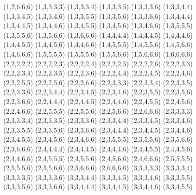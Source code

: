 \begin{tabbing}
(1,2,6,6,6) \> (1,3,3,3,3) \> (1,3,3,3,4) \> (1,3,3,3,5) \> (1,3,3,3,6) \> (1,3,3,4,4) \\ 
(1,3,3,4,5) \> (1,3,3,4,6) \> (1,3,3,5,5) \> (1,3,3,5,6) \> (1,3,3,6,6) \> (1,3,4,4,4) \\ 
(1,3,4,4,5) \> (1,3,4,4,6) \> (1,3,4,5,5) \> (1,3,4,5,6) \> (1,3,4,6,6) \> (1,3,5,5,5) \\ 
(1,3,5,5,6) \> (1,3,5,6,6) \> (1,3,6,6,6) \> (1,4,4,4,4) \> (1,4,4,4,5) \> (1,4,4,4,6) \\ 
(1,4,4,5,5) \> (1,4,4,5,6) \> (1,4,4,6,6) \> (1,4,5,5,5) \> (1,4,5,5,6) \> (1,4,5,6,6) \\ 
(1,4,6,6,6) \> (1,5,5,5,5) \> (1,5,5,5,6) \> (1,5,5,6,6) \> (1,5,6,6,6) \> (1,6,6,6,6) \\ 
(2,2,2,2,2) \> (2,2,2,2,3) \> (2,2,2,2,4) \> (2,2,2,2,5) \> (2,2,2,2,6) \> (2,2,2,3,3) \\ 
(2,2,2,3,4) \> (2,2,2,3,5) \> (2,2,2,3,6) \> (2,2,2,4,4) \> (2,2,2,4,5) \> (2,2,2,4,6) \\ 
(2,2,2,5,5) \> (2,2,2,5,6) \> (2,2,2,6,6) \> (2,2,3,3,3) \> (2,2,3,3,4) \> (2,2,3,3,5) \\ 
(2,2,3,3,6) \> (2,2,3,4,4) \> (2,2,3,4,5) \> (2,2,3,4,6) \> (2,2,3,5,5) \> (2,2,3,5,6) \\ 
(2,2,3,6,6) \> (2,2,4,4,4) \> (2,2,4,4,5) \> (2,2,4,4,6) \> (2,2,4,5,5) \> (2,2,4,5,6) \\ 
(2,2,4,6,6) \> (2,2,5,5,5) \> (2,2,5,5,6) \> (2,2,5,6,6) \> (2,2,6,6,6) \> (2,3,3,3,3) \\ 
(2,3,3,3,4) \> (2,3,3,3,5) \> (2,3,3,3,6) \> (2,3,3,4,4) \> (2,3,3,4,5) \> (2,3,3,4,6) \\ 
(2,3,3,5,5) \> (2,3,3,5,6) \> (2,3,3,6,6) \> (2,3,4,4,4) \> (2,3,4,4,5) \> (2,3,4,4,6) \\ 
(2,3,4,5,5) \> (2,3,4,5,6) \> (2,3,4,6,6) \> (2,3,5,5,5) \> (2,3,5,5,6) \> (2,3,5,6,6) \\ 
(2,3,6,6,6) \> (2,4,4,4,4) \> (2,4,4,4,5) \> (2,4,4,4,6) \> (2,4,4,5,5) \> (2,4,4,5,6) \\ 
(2,4,4,6,6) \> (2,4,5,5,5) \> (2,4,5,5,6) \> (2,4,5,6,6) \> (2,4,6,6,6) \> (2,5,5,5,5) \\ 
(2,5,5,5,6) \> (2,5,5,6,6) \> (2,5,6,6,6) \> (2,6,6,6,6) \> (3,3,3,3,3) \> (3,3,3,3,4) \\ 
(3,3,3,3,5) \> (3,3,3,3,6) \> (3,3,3,4,4) \> (3,3,3,4,5) \> (3,3,3,4,6) \> (3,3,3,5,5) \\ 
(3,3,3,5,6) \> (3,3,3,6,6) \> (3,3,4,4,4) \> (3,3,4,4,5) \> (3,3,4,4,6) \> (3,3,4,5,5) \\ 

\end{tabbing}

